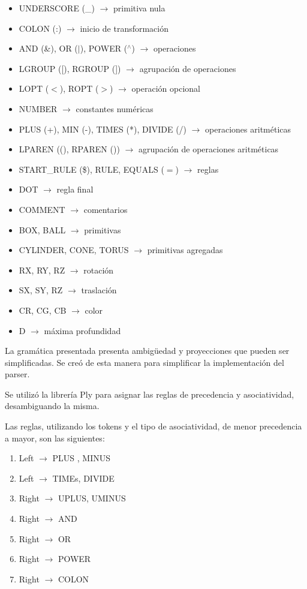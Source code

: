 \documentclass[a4paper, 10pt, twoside]{article}
\begin{document}
\begin{itemize}
\item UNDERSCORE (\_) $\to$ primitiva nula
\item COLON (:) $\to$ inicio de transformación
\item AND (\&), OR ($\vert$), POWER ($ ^\wedge $) $\to$ operaciones
\item LGROUP ([), RGROUP (]) $\to$ agrupación de operaciones
\item LOPT ($<$), ROPT ($>$) $\to$ operación opcional
\item NUMBER $\to$ constantes numéricas
\item PLUS (+), MIN (-), TIMES (*), DIVIDE (/) $\to$ operaciones aritméticas
\item LPAREN ((), RPAREN ()) $\to$ agrupación de operaciones aritméticas
\item START\_RULE (\$), RULE, EQUALS ($=$) $\to$ reglas
\item DOT $\to$ regla final
\item COMMENT $\to$ comentarios
\item BOX, BALL $\to$ primitivas
\item CYLINDER, CONE, TORUS $\to$ primitivas agregadas
\item RX, RY, RZ $\to$ rotación
\item SX, SY, RZ $\to$ traslación
\item CR, CG, CB $\to$ color
\item D $\to$ máxima profundidad
\end{itemize}

La gramática presentada presenta ambigüedad y proyecciones que pueden ser simplificadas. Se creó de esta manera para simplificar la implementación del parser.

Se utilizó la librería Ply para asignar las reglas de precedencia y asociatividad, desambiguando la misma.

Las reglas, utilizando los tokens y el tipo de asociatividad, de menor precedencia a mayor, son las siguientes:

\begin{enumerate}
\item Left $\to$ PLUS , MINUS
\item Left $\to$ TIMEs, DIVIDE
\item Right $\to$ UPLUS, UMINUS
\item Right $\to$ AND
\item Right $\to$ OR
\item Right $\to$ POWER
\item Right $\to$ COLON
\end{enumerate}
\end{document}
